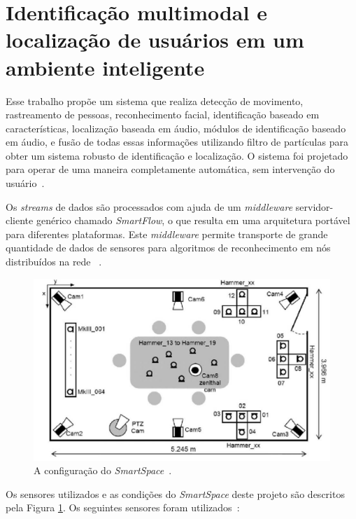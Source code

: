 \section{Identificação multimodal e localização de usuários em um ambiente inteligente}

Esse trabalho propõe um sistema que realiza detecção de movimento, rastreamento de pessoas, reconhecimento facial, identificação baseado em características, localização baseada em áudio, módulos de identificação baseado em áudio, e fusão de todas essas informações utilizando filtro de partículas para obter um sistema robusto de identificação e localização. O sistema foi projetado para operar de uma maneira completamente automática, sem intervenção do usuário~\cite{salah}.

Os \textit{streams} de dados são processados com ajuda de um \textit{middleware} servidor-cliente genérico chamado \textit{SmartFlow}, o que resulta em uma arquitetura portável para diferentes plataformas. Este \textit{middleware} permite transporte de grande quantidade de dados de sensores para algoritmos de reconhecimento em nós distribuídos na rede ~\cite{salah}.

	\begin{figure}[hbt]
		\begin{center}
			\includegraphics[scale=0.4]{figuras/3.TrabalhosCorrelatos/upc.png}
		\end{center}
		\caption{A configuração do \textit{SmartSpace}~\cite{salah}.}
		\label{upc}
	\end{figure}

Os sensores utilizados e as condições do \textit{SmartSpace} deste projeto são descritos pela Figura \ref{upc}. Os seguintes sensores foram utilizados~\cite{salah}:

